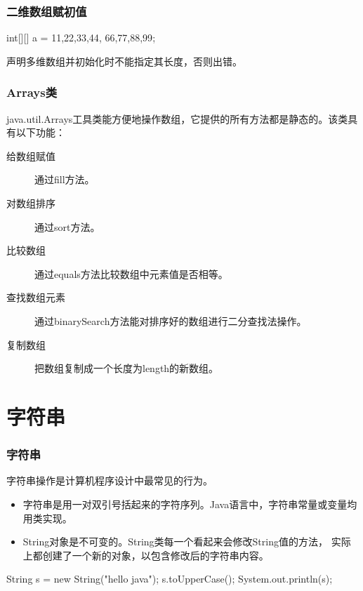 \begin{frame}[fragile]
  \frametitle{二维数组赋初值}

  \begin{javaCode}
    int[][] a = {{11,22,33,44}, {66,77,88,99}};    
  \end{javaCode}


  声明多维数组并初始化时不能指定其长度，否则出错。


\end{frame}

\begin{frame}[fragile]
  \frametitle{Arrays类}

  java.util.Arrays工具类能方便地操作数组，它提供的所有方法都是静态的。该类具有以下功能：

  \begin{description}
  \item[给数组赋值] 通过fill方法。
  \item[对数组排序] 通过sort方法。
  \item[比较数组] 通过equals方法比较数组中元素值是否相等。
  \item[查找数组元素] 通过binarySearch方法能对排序好的数组进行二分查找法操作。
  \item[复制数组] 把数组复制成一个长度为length的新数组。
  \end{description}

\end{frame}

\section{字符串}

\begin{frame}[fragile]
  \frametitle{字符串}
  
  {\hei 字符串操作是计算机程序设计中最常见的行为。}

  \begin{itemize}
  \item 字符串是用一对双引号括起来的字符序列。Java语言中，字符串常量或变量均用类实现。
  \item String对象是不可变的。String类每一个看起来会修改String值的方法，
    实际上都创建了一个新的对象，以包含修改后的字符串内容。
  \end{itemize}

  \begin{javaCode}
    String s = new String("hello java");
    s.toUpperCase();
    System.out.println(s);
  \end{javaCode}

\end{frame}



